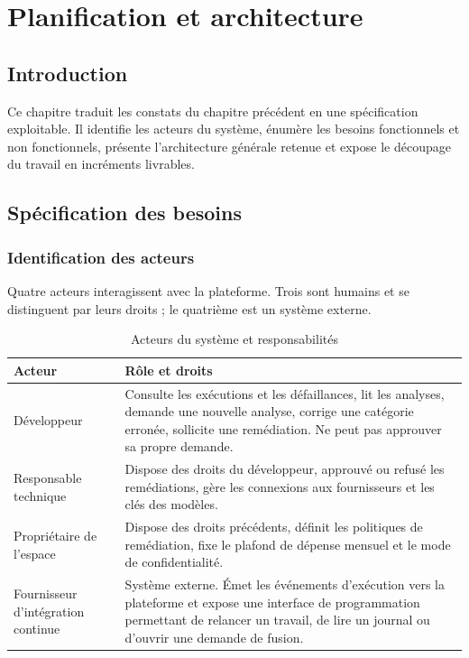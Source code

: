 \documentclass[12pt,a4paper,oneside]{report}
\begin{document}
\clearpage
\chapter{Planification et architecture}

\section*{Introduction}

Ce chapitre traduit les constats du chapitre précédent en une spécification
exploitable. Il identifie les acteurs du système, énumère les besoins
fonctionnels et non fonctionnels, présente l'architecture générale retenue et
expose le découpage du travail en incréments livrables.

\section{Spécification des besoins}

\subsection{Identification des acteurs}

Quatre acteurs interagissent avec la plateforme. Trois sont humains et se
distinguent par leurs droits ; le quatrième est un système externe.

\begin{table}[htbp]
\centering
\caption{Acteurs du système et responsabilités}
\label{tab:acteurs}
\small
\begin{tabularx}{\textwidth}{@{}lX@{}}
\toprule
\textbf{Acteur} & \textbf{Rôle et droits} \\
\midrule
Développeur & Consulte les exécutions et les défaillances, lit les analyses, demande une nouvelle analyse, corrige une catégorie erronée, sollicite une remédiation. Ne peut pas approuver sa propre demande. \\
\addlinespace
Responsable technique & Dispose des droits du développeur, approuvé ou refusé les remédiations, gère les connexions aux fournisseurs et les clés des modèles. \\
\addlinespace
Propriétaire de l'espace & Dispose des droits précédents, définit les politiques de remédiation, fixe le plafond de dépense mensuel et le mode de confidentialité. \\
\addlinespace
Fournisseur d'intégration continue & Système externe. Émet les événements d'exécution vers la plateforme et expose une interface de programmation permettant de relancer un travail, de lire un journal ou d'ouvrir une demande de fusion. \\
\bottomrule
\end{tabularx}
\end{table}
\end{document}
